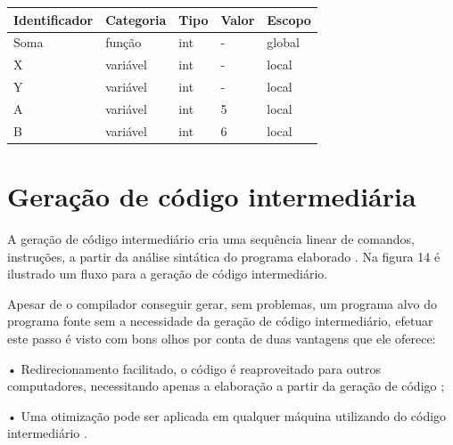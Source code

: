 \documentclass[12pt,oneside,a4paper,chapter=TITLE,section=TITLE,sumario=tradicional]{abntex2}
\begin{document}
\begin{quadro}[htb]
    \centering
    \vspace{0.5cm}
    \begin{tabular}{|p{3.0cm}|p{3.0cm}|p{3.0cm}|p{3.0cm}|p{3.0cm}|}
        \hline
        \textbf{Identificador} & \textbf{Categoria} & \textbf{Tipo} & \textbf{Valor} & \textbf{Escopo} \\ 
        \hline\hline
        Soma & função & int  &  -  & global   \\ \hline 
        X & variável  & int  & - & local  \\ \hline
        Y & variável  & int  &  -  & local  \\ \hline
        A & variável  & int  &  5  & local   \\ \hline
        B & variável  & int  & 6  & local   \\ \hline
    \end{tabular}

    
\end{quadro}


\section{Geração de código intermediária}
\label{sec:geracao-de-codigo-intermediaria}

A geração de código intermediário cria uma sequência linear de comandos, instruções, a partir da análise sintática do programa elaborado \cite{pedro2018}. Na figura 14 é ilustrado um fluxo para a geração de código intermediário.

\begin{figure}[H]
\end{figure}

Apesar de o compilador conseguir gerar, sem problemas, um programa alvo do programa fonte sem a necessidade da geração de código intermediário, efetuar este passo é visto com bons olhos por conta de duas vantagens que ele oferece:

•	Redirecionamento facilitado, o código é reaproveitado para outros computadores, necessitando apenas a elaboração a partir da geração de código \cite{alfred1995};


•	Uma otimização pode ser aplicada em qualquer máquina utilizando do código intermediário \cite{alfred1995}.
\end{document}

